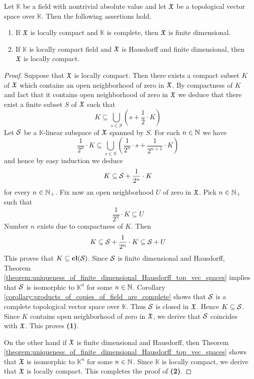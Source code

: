 \documentclass[10pt]{amsart}
\begin{document}
\begin{theorem}[Riesz]\label{theorem:locally_compact_hausdorff_tvs_are_finite_dimensional}
	Let $\mathbb{K}$ be a field with nontrivial absolute value and let ${\mathfrak X}$ be a topological vector space over $\mathbb{K}$. Then the following assertions hold.
	\begin{enumerate}[label=\emph{\textbf{(\arabic*)}}, leftmargin=*]
		\item If ${\mathfrak X}$ is locally compact and $\mathbb{K}$ is complete, then ${\mathfrak X}$ is finite dimensional.
		\item If $\mathbb{K}$ is locally compact field and ${\mathfrak X}$ is Hausdorff and finite dimensional, then ${\mathfrak X}$ is locally compact.
	\end{enumerate}
\end{theorem}
\begin{proof}
	Suppose that ${\mathfrak X}$ is locally compact. Then there exists a compact subset $K$ of ${\mathfrak X}$ which contains an open neighborhood of zero in ${\mathfrak X}$. By compactness of $K$ and fact that it contains open neighborhood of zero in ${\mathfrak X}$ we deduce that there exist a finite subset $S$ of ${\mathfrak X}$ such that
	$$K \subseteq \bigcup_{s\in S}\left(s + \frac{1}{2}\cdot K\right)$$
	Let ${\mathcal S}$ be a $\mathbb{K}$-linear subspace of ${\mathfrak X}$ spanned by $S$. For each $n \in {\mathbb N}$ we have
	$$\frac{1}{2^n}\cdot K \subseteq \bigcup_{s\in S}\left(\frac{1}{2^n}\cdot s + \frac{1}{2^{n+1}}\cdot K\right)$$
	and hence by easy induction we deduce
	$$K \subseteq {\mathcal S} + \frac{1}{2^n}\cdot K$$
	for every $n \in {\mathbb N}_+$. Fix now an open neighborhood $U$ of zero in ${\mathfrak X}$. Pick $n \in {\mathbb N}_+$ such that
	$$\frac{1}{2^n}\cdot K \subseteq U$$
	Number $n$ exists due to compactness of $K$. Then
	$$K \subseteq {\mathcal S} + \frac{1}{2^n}\cdot K \subseteq {\mathcal S} + U$$
	This proves that $K \subseteq \mathbf{cl}({\mathcal S})$. Since ${\mathcal S}$ is finite dimensional and Hausdorff, Theorem \ref{theorem:uniqueness_of_finite_dimensional_Hausdorff_top_vec_spaces} implies that ${\mathcal S}$ is isomorphic to $\mathbb{K}^n$ for some $n \in {\mathbb N}$. Corollary \ref{corollary:products_of_copies_of_field_are_complete} shows that ${\mathcal S}$ is a complete topological vector space over $\mathbb{K}$. Thus ${\mathcal S}$ is closed in ${\mathfrak X}$. Hence $K \subseteq {\mathcal S}$. Since $K$ contains open neighborhood of zero in ${\mathfrak X}$, we derive that ${\mathcal S}$ coincides with ${\mathfrak X}$. This proves \textbf{(1)}.

	On the other hand if ${\mathfrak X}$ is finite dimensional and Hausdorff, then Theorem \ref{theorem:uniqueness_of_finite_dimensional_Hausdorff_top_vec_spaces} shows that ${\mathfrak X}$ is isomorphic to $\mathbb{K}^n$ for some $n \in {\mathbb N}$. Since $\mathbb{K}$ is locally compact, we derive that ${\mathfrak X}$ is locally compact. This completes the proof of \textbf{(2)}.
\end{proof}
\end{document}
